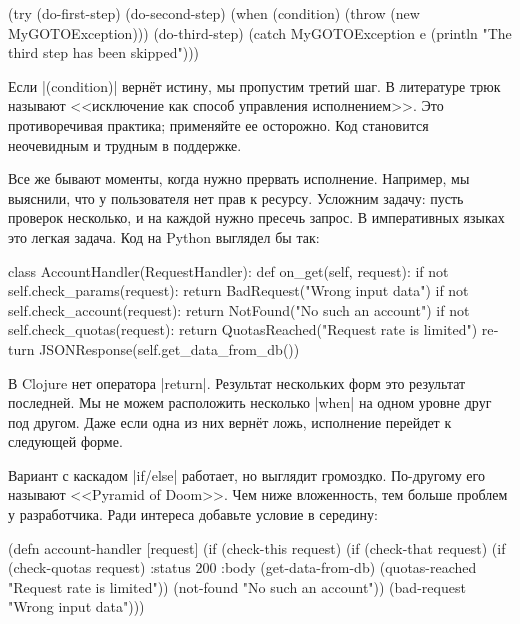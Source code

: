 \begin{english}
  \begin{clojure}
(try
  (do-first-step)
  (do-second-step)
  (when (condition)
    (throw (new MyGOTOException)))
  (do-third-step)
  (catch MyGOTOException e
    (println "The third step has been skipped")))
  \end{clojure}
\end{english}

Если \spverb|(condition)| верн\"{е}т истину, мы пропустим третий шаг. В литературе
трюк называют <<исключение как способ управления исполнением>>. Это
противоречивая практика; применяйте ее осторожно. Код становится неочевидным и
трудным в поддержке.

Все же бывают моменты, когда нужно прервать исполнение. Например, мы выяснили,
что у пользователя нет прав к ресурсу. Усложним задачу: пусть проверок
несколько, и на каждой нужно пресечь запрос. В императивных языках это легкая
задача. Код на Python выглядел бы так:

\begin{english}
  \begin{python}
class AccountHandler(RequestHandler):
  def on_get(self, request):
    if not self.check_params(request):
      return BadRequest("Wrong input data")
    if not self.check_account(request):
      return NotFound("No such an account")
    if not self.check_quotas(request):
      return QuotasReached("Request rate is limited")
    return JSONResponse(self.get_data_from_db())
  \end{python}
\end{english}

В Clojure нет оператора \spverb|return|. Результат нескольких форм это результат
последней. Мы не можем расположить несколько \spverb|when| на одном уровне друг
под другом. Даже если одна из них верн\"{е}т ложь, исполнение перейдет к следующей
форме.

Вариант с каскадом \spverb|if/else| работает, но выглядит громоздко. По-другому
его называют <<Pyramid of Doom>>. Чем ниже вложенность, тем больше проблем у
разработчика. Ради интереса добавьте условие в середину:

\begin{english}
  \begin{clojure}
(defn account-handler [request]
  (if (check-this request)
    (if (check-that request)
      (if (check-quotas request)
        {:status 200
         :body (get-data-from-db)}
        (quotas-reached "Request rate is limited"))
      (not-found "No such an account"))
    (bad-request "Wrong input data")))
  \end{clojure}
\end{english}

